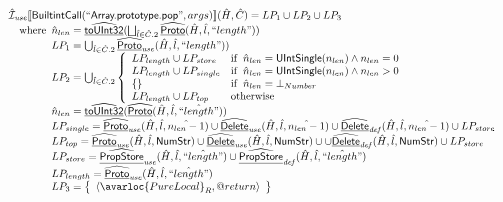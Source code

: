 \[
\begin{array}{l}

\aI_{\it use}\lbr \SF{BuiltintCall}(``\SF{Array.prototype.pop}",args)\rbr(\hat{H},\hat{C}) = LP_1 \cup LP_2 \cup LP_3\\
\quad\wherec{
  \hat{n}_{len} = \ahf{toUInt32}(\bigsqcup_{\hat{l} \in \hat{C}.2}  \ahf{Proto}(\hat{H}, \hat{l}, ``length"))\\
  LP_1 = \bigcup_{\hat{l} \in \hat{C}.2} \ahf{Proto}_{\it use}(\hat{H}, \hat{l}, ``length"))\\
  LP_2 = \bigcup_{\hat{l} \in \hat{C}.2}  \left\{\begin{array}{ll}
      LP_{length} \cup LP_{store} & \ifc{\hat{n}_{len} = \SF{UIntSingle}(n_{len}) \land n_{len} = 0}\\
      LP_{length} \cup LP_{single} & \ifc{\hat{n}_{len} = \SF{UIntSingle}(n_{len}) \land n_{len} > 0}\\
      \set{} & \ifc{\hat{n}_{len} = \bot_{Number}}\\
      LP_{length} \cup LP_{top} & \owc
    \end{array}\right.\\
  \hat{n}_{len} = \ahf{toUInt32}(\ahf{Proto}(\hat{H}, \hat{l}, \hat{``length"}))\\
  LP_{single} = \ahf{Proto}_{\it use}(\hat{H}, \hat{l}, \hat{n_{len}-1}) \cup \ahf{Delete}_{\it use}(\hat{H}, \hat{l}, \hat{n_{len}-1}) \cup \ahf{Delete}_{\it def}(\hat{H}, \hat{l}, \hat{n_{len}-1}) \cup LP_{store}\\
  LP_{top} = \ahf{Proto}_{\it use}(\hat{H}, \hat{l}, \SF{NumStr}) \cup \ahf{Delete}_{\it use}(\hat{H}, \hat{l}, \SF{NumStr}) \cup \cup \ahf{Delete}_{\it def}(\hat{H}, \hat{l}, \SF{NumStr}) \cup LP_{store}\\
  LP_{store} = \ahf{PropStore}_{\it use}(\hat{H}, \hat{l}, \hat{``length"}) \cup \ahf{PropStore}_{\it def}(\hat{H}, \hat{l}, \hat{``length"})\\
  LP_{length} = \ahf{Proto}_{\it use}(\hat{H}, \hat{l}, \hat{``length"})\\
  LP_3 = \set{\langle\avarloc{PureLocal}_R,\varprop{return}\rangle}\\
  }\\
\\


\end{array}\]
